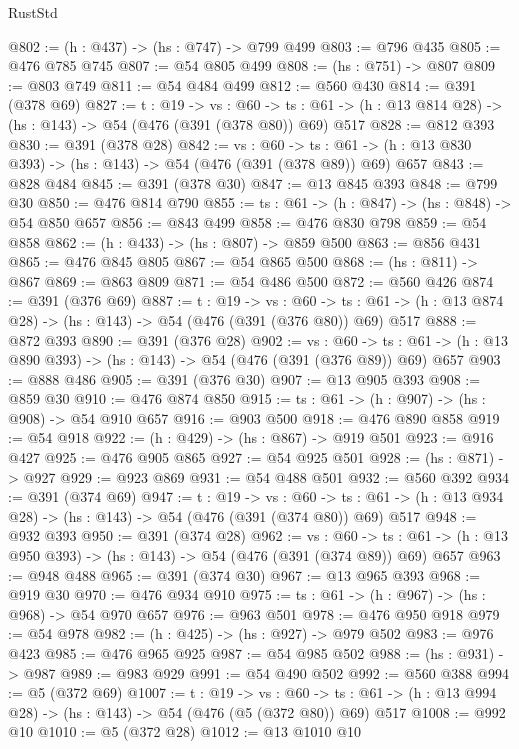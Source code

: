 \begin{lexlean}{RustStd}
\begin{coremodule}
{\begin{coremodule}
{{{{{{{{{{{{{{{{{{{{{{{{{{{{{{{{{{{{{{@802 := (h : @437) -> (hs : @747) -> @799 @499
@803 := @796 @435
@805 := @476 @785 @745
@807 := @54 @805 @499
@808 := (hs : @751) -> @807
@809 := @803 @749
@811 := @54 @484 @499
@812 := @560 @430
@814 := @391 (@378 @69)
@827 := {t : @19} ->
  {vs : @60} ->
  {ts : @61} -> (h : @13 @814 @28) -> (hs : @143) -> @54 (@476 (@391 (@378 @80)) @69) @517
@828 := @812 @393
@830 := @391 (@378 @28)
@842 := {vs : @60} ->
  {ts : @61} -> (h : @13 @830 @393) -> (hs : @143) -> @54 (@476 (@391 (@378 @89)) @69) @657
@843 := @828 @484
@845 := @391 (@378 @30)
@847 := @13 @845 @393
@848 := @799 @30
@850 := @476 @814 @790
@855 := {ts : @61} -> (h : @847) -> (hs : @848) -> @54 @850 @657
@856 := @843 @499
@858 := @476 @830 @798
@859 := @54 @858
@862 := (h : @433) -> (hs : @807) -> @859 @500
@863 := @856 @431
@865 := @476 @845 @805
@867 := @54 @865 @500
@868 := (hs : @811) -> @867
@869 := @863 @809
@871 := @54 @486 @500
@872 := @560 @426
@874 := @391 (@376 @69)
@887 := {t : @19} ->
  {vs : @60} ->
  {ts : @61} -> (h : @13 @874 @28) -> (hs : @143) -> @54 (@476 (@391 (@376 @80)) @69) @517
@888 := @872 @393
@890 := @391 (@376 @28)
@902 := {vs : @60} ->
  {ts : @61} -> (h : @13 @890 @393) -> (hs : @143) -> @54 (@476 (@391 (@376 @89)) @69) @657
@903 := @888 @486
@905 := @391 (@376 @30)
@907 := @13 @905 @393
@908 := @859 @30
@910 := @476 @874 @850
@915 := {ts : @61} -> (h : @907) -> (hs : @908) -> @54 @910 @657
@916 := @903 @500
@918 := @476 @890 @858
@919 := @54 @918
@922 := (h : @429) -> (hs : @867) -> @919 @501
@923 := @916 @427
@925 := @476 @905 @865
@927 := @54 @925 @501
@928 := (hs : @871) -> @927
@929 := @923 @869
@931 := @54 @488 @501
@932 := @560 @392
@934 := @391 (@374 @69)
@947 := {t : @19} ->
  {vs : @60} ->
  {ts : @61} -> (h : @13 @934 @28) -> (hs : @143) -> @54 (@476 (@391 (@374 @80)) @69) @517
@948 := @932 @393
@950 := @391 (@374 @28)
@962 := {vs : @60} ->
  {ts : @61} -> (h : @13 @950 @393) -> (hs : @143) -> @54 (@476 (@391 (@374 @89)) @69) @657
@963 := @948 @488
@965 := @391 (@374 @30)
@967 := @13 @965 @393
@968 := @919 @30
@970 := @476 @934 @910
@975 := {ts : @61} -> (h : @967) -> (hs : @968) -> @54 @970 @657
@976 := @963 @501
@978 := @476 @950 @918
@979 := @54 @978
@982 := (h : @425) -> (hs : @927) -> @979 @502
@983 := @976 @423
@985 := @476 @965 @925
@987 := @54 @985 @502
@988 := (hs : @931) -> @987
@989 := @983 @929
@991 := @54 @490 @502
@992 := @560 @388
@994 := @5 (@372 @69)
@1007 := {t : @19} ->
  {vs : @60} ->
  {ts : @61} -> (h : @13 @994 @28) -> (hs : @143) -> @54 (@476 (@5 (@372 @80)) @69) @517
@1008 := @992 @10
@1010 := @5 (@372 @28)
@1012 := @13 @1010 @10
}}}}}}}}}}}}}}}}}}}}}}}}}}}}}}}}}}}}}}
\end{coremodule}}
\end{coremodule}
\end{lexlean}
